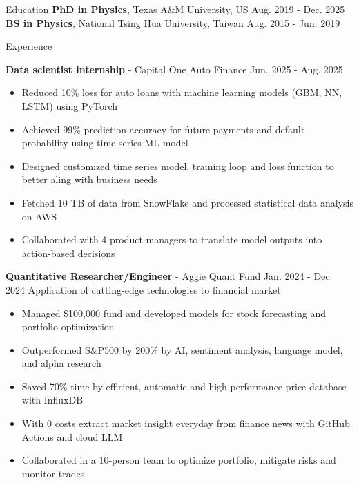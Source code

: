 \documentclass{resume}
\begin{document}
\vspace{-1.5em}
\begin{rSection}{Education}
\vspace{-0.25em}
{\bf PhD in Physics}, Texas A\&M University, US \hfill {Aug. 2019 - Dec. 2025} \\
{\bf BS in Physics}, National Tsing Hua University, Taiwan \hfill {Aug. 2015 - Jun. 2019}
\end{rSection}


\begin{rSection}{Experience}
    \vspace{-1.5em}
    \item \textbf{Data scientist internship} - Capital One Auto Finance \hfill Jun. 2025 - Aug. 2025
        \begin{itemize}
        \item Reduced 10\% loss for auto loans with machine learning models (GBM, NN, LSTM) using PyTorch
        \item Achieved 99\% prediction accuracy for future payments and default probability using time-series ML model
        \item Designed customized time series model, training loop and loss function to better aling with business needs
        \item Fetched 10 TB of data from SnowFlake and processed statistical data analysis on AWS
        \item Collaborated with 4 product managers to translate model outputs into action-based decisions
        \end{itemize}

    \vspace{0.5em}
    \item \textbf{Quantitative Researcher/Engineer} - \href{https://www.linkedin.com/company/aggieqf}{Aggie Quant Fund} \hfill Jan. 2024 - Dec. 2024
        \newline\hspace*{0.5em} {\normalsize Application of cutting-edge technologies to financial market}
        \begin{itemize}
        \item Managed \$100,000 fund and developed models for stock forecasting and portfolio optimization
        \item Outperformed S\&P500 by 200\% by AI, sentiment analysis, language model, and alpha research
        \item Saved 70\% time by efficient, automatic and high-performance price database with InfluxDB
        \item With 0 costs extract market insight everyday from finance news with GitHub Actions and cloud LLM
        \item Collaborated in a 10-person team to optimize portfolio, mitigate risks and monitor trades
        \end{itemize}


\end{rSection}
\end{document}
